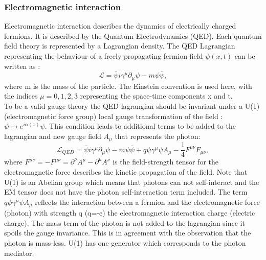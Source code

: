 \subsubsection{Electromagnetic interaction}
Electromagnetic interaction describes the dynamics of electrically charged fermions. It is described by the Quantum Electrodynamics (QED). Each quantum field theory is represented by a Lagrangian density. The QED Lagrangian representing the behaviour of a freely propagating fermion field $\psi (x,t)$ can be written as : 
\begin{equation}
    \mathcal{L} = \bar{\psi}i\gamma^\mu\partial_\mu\psi - m\psi\bar{\psi},
\end{equation}
where m is the mass of the particle. The Einstein convention is used here, with the indices $\mu= 0,1,2,3$ representing the space-time components x and t. \\ 
To be a valid gauge theory the QED lagrangian should be invariant under a U(1) (electromagnetic force group) local gauge transformation of the field : $\psi\rightarrow e^{i\alpha(x)}\psi$. This condition leads to additional terms to be added to the lagrangian and new gauge field $A_{\mu}$ that represents the photon:
\begin{equation}
    \mathcal{L}_{QED} = \bar{\psi}i\gamma^\mu\partial_\mu\psi - m\psi\bar{\psi} + q\psi\gamma^{\mu}\psi A_{\mu} - \frac{1}{4}F^{\mu\nu}F_{\mu\nu},
\end{equation}
where $F^{\mu\nu} = - F^{\mu\nu} = \partial^{\nu}A^{\mu} - \partial^{\mu}A^{\nu}$ is the field-strength tensor for the electromagnetic force describes the kinetic propagation of the field. Note that U(1) is an Abelian group which means that photons can not self-interact and the EM tensor does not have the photon self-interaction term included. The term $q\psi\gamma^{\mu}\psi A_{\mu}$ reflects the interaction between a fermion and the electromagnetic force (photon) with strength q (q=-e) the electromagnetic interaction charge (electric charge). The mass term of the photon is not added to the lagrangian since it spoils the gauge invariance. This is in agreement with the observation that the photon is mass-less. U(1) has one generator which corresponds to the photon mediator.
